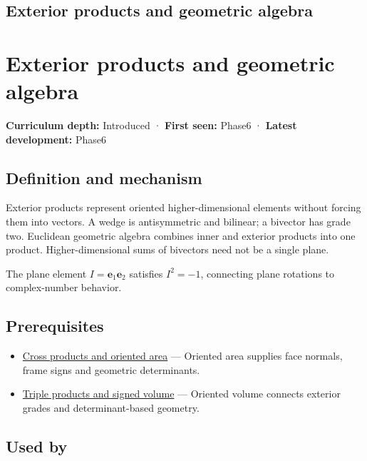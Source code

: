 \hypertarget{appendix-e1960925d1b8}{}
\section*{Exterior products and geometric algebra}
\chapter{Exterior products and geometric algebra}\label{appendix-e1960925d1b8-exterior-products-and-geometric-algebra}

\textbf{Curriculum depth:} Introduced · \textbf{First seen:} Phase6 · \textbf{Latest development:} Phase6

\section{Definition and mechanism}\label{appendix-e1960925d1b8-definition-and-mechanism}

Exterior products represent oriented higher-dimensional elements without forcing them into vectors. A wedge is antisymmetric and bilinear; a bivector has grade two. Euclidean geometric algebra combines inner and exterior products into one product. Higher-dimensional sums of bivectors need not be a single plane.

The plane element \(I=\mathbf e_1\mathbf e_2\) satisfies \(I^2=-1\), connecting plane rotations to complex-number behavior.

\section{Prerequisites}\label{appendix-e1960925d1b8-prerequisites}

\begin{itemize}
\tightlist
\item
  \hyperref[appendix-2391db8052b1]{Cross products and oriented area} --- Oriented area supplies face normals, frame signs and geometric determinants.
\item
  \hyperref[appendix-5caa058bd9c7]{Triple products and signed volume} --- Oriented volume connects exterior grades and determinant-based geometry.
\end{itemize}

\section{Used by}\label{appendix-e1960925d1b8-used-by}

